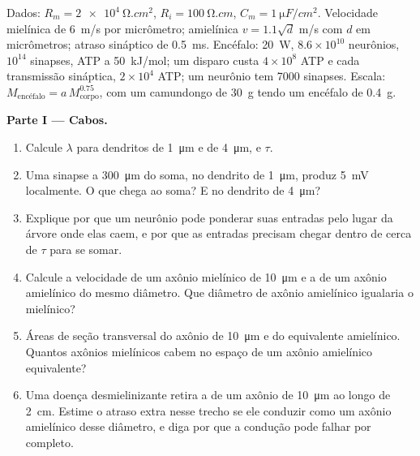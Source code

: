 \begin{problem}
\label{pb:b3:nervous-systems:1}
Dados: $R_{m} = \qty{2e4}{\ohm.cm^2}$, $R_{i} = \qty{100}{\ohm.cm}$,
$C_{m} = \qty{1}{\micro F/cm^2}$. Velocidade mielínica de \qty{6}{m/s}
por micrômetro; amielínica $v = 1.1\sqrt{d}$ m/s com $d$ em
micrômetros; atraso sináptico de \qty{0.5}{ms}. Encéfalo: \qty{20}{W},
$8.6\times 10^{10}$ neurônios, $10^{14}$ sinapses, ATP a
\qty{50}{kJ/mol}; um disparo custa $4\times 10^{8}$ ATP e cada
transmissão sináptica, $2\times 10^{4}$ ATP; um neurônio tem \num{7000}
sinapses. Escala: $M_{\text{encéfalo}} = a\,M_{\text{corpo}}^{0.75}$, com um
camundongo de \qty{30}{g} tendo um encéfalo de \qty{0.4}{g}.

\medskip
\noindent\textbf{Parte I --- Cabos.}
\begin{enumerate}
  \item Calcule $\lambda$ para dendritos de \qty{1}{\micro m} e de
        \qty{4}{\micro m}, e $\tau$.
  \item Uma sinapse a \qty{300}{\micro m} do soma, no dendrito de
        \qty{1}{\micro m}, produz \qty{5}{mV} localmente. O que chega ao
        soma? E no dendrito de \qty{4}{\micro m}?
  \item Explique por que um neurônio pode ponderar suas entradas pelo
        lugar da árvore onde elas caem, e por que as entradas precisam
        chegar dentro de cerca de $\tau$ para se somar.
  \item Calcule a velocidade de um axônio mielínico de \qty{10}{\micro m}
        e a de um axônio amielínico do mesmo diâmetro. Que diâmetro de
        axônio amielínico igualaria o mielínico?
  \item Áreas de seção transversal do axônio de \qty{10}{\micro m} e do
        equivalente amielínico. Quantos axônios mielínicos cabem no
        espaço de um axônio amielínico equivalente?
  \item Uma doença desmielinizante retira a  de um axônio de
        \qty{10}{\micro m} ao longo de \qty{2}{cm}. Estime o atraso extra
        nesse trecho se ele conduzir como um axônio amielínico desse
        diâmetro, e diga por que a condução pode falhar por completo.
\end{enumerate}


\end{problem}
